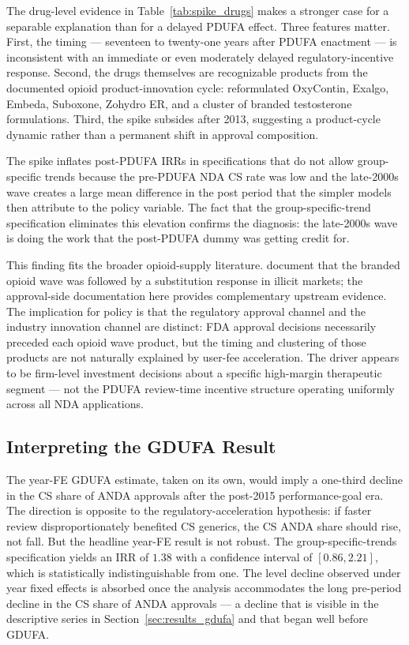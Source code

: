 The drug-level evidence in Table~\ref{tab:spike_drugs} makes a stronger case for a separable explanation than for a delayed PDUFA effect. Three features matter. First, the timing --- seventeen to twenty-one years after PDUFA enactment --- is inconsistent with an immediate or even moderately delayed regulatory-incentive response. Second, the drugs themselves are recognizable products from the documented opioid product-innovation cycle: reformulated OxyContin, Exalgo, Embeda, Suboxone, Zohydro ER, and a cluster of branded testosterone formulations. Third, the spike subsides after 2013, suggesting a product-cycle dynamic rather than a permanent shift in approval composition.

The spike inflates post-PDUFA IRRs in specifications that do not allow group-specific trends because the pre-PDUFA NDA CS rate was low and the late-2000s wave creates a large mean difference in the post period that the simpler models then attribute to the policy variable. The fact that the group-specific-trend specification eliminates this elevation confirms the diagnosis: the late-2000s wave is doing the work that the post-PDUFA dummy was getting credit for.

This finding fits the broader opioid-supply literature. \textcite{alpertSupplySideDrugPolicy2018a} document that the branded opioid wave was followed by a substitution response in illicit markets; the approval-side documentation here provides complementary upstream evidence. The implication for policy is that the regulatory approval channel and the industry innovation channel are distinct: FDA approval decisions necessarily preceded each opioid wave product, but the timing and clustering of those products are not naturally explained by user-fee acceleration. The driver appears to be firm-level investment decisions about a specific high-margin therapeutic segment --- not the PDUFA review-time incentive structure operating uniformly across all NDA applications.

\subsection{Interpreting the GDUFA Result}

The year-FE GDUFA estimate, taken on its own, would imply a one-third decline in the CS share of ANDA approvals after the post-2015 performance-goal era. The direction is opposite to the regulatory-acceleration hypothesis: if faster review disproportionately benefited CS generics, the CS ANDA share should rise, not fall. But the headline year-FE result is not robust. The group-specific-trends specification yields an IRR of $1.38$ with a confidence interval of $[0.86, 2.21]$, which is statistically indistinguishable from one. The level decline observed under year fixed effects is absorbed once the analysis accommodates the long pre-period decline in the CS share of ANDA approvals --- a decline that is visible in the descriptive series in Section~\ref{sec:results_gdufa} and that began well before GDUFA.

